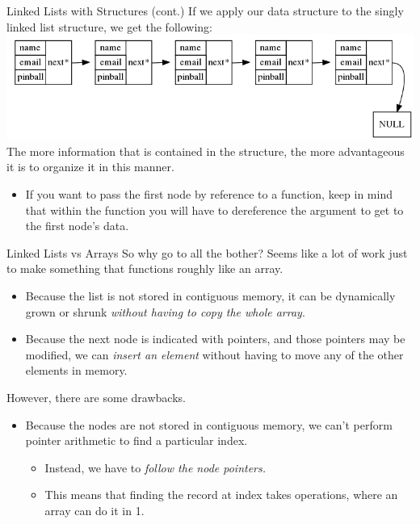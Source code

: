 \documentclass[11pt]{beamer}
\let\OldTexttt\texttt
\renewcommand{\texttt}[1]{\OldTexttt{\color{teal}{#1}}}
\begin{document}
\begin{frame}{Linked Lists with Structures (cont.)}
If we apply our data structure to the singly linked list structure, we get the following:
\center
\includegraphics[scale=0.3]{graphs/SLL.png}
\flushleft
The more information that is contained in the structure, the more advantageous it is to organize it in this manner.  
\begin{itemize}
\item If you want to pass the first node by reference to a function, keep in mind that within the function you will have to dereference the argument to get to the first node's data. 
\end{itemize}
\end{frame}

\begin{frame}{Linked Lists vs Arrays}
So why go to all the bother?  Seems like a lot of work just to make something that functions roughly like an array.  
\begin{itemize}
\item Because the list is not stored in contiguous memory, it can be dynamically grown or shrunk \emph{without having to copy the whole array}.  
\item Because the next node is indicated with pointers, and those pointers may be modified, we can \emph{insert an element} without having to move any of the other elements in memory.  
\end{itemize}
However, there are some drawbacks.
\begin{itemize}
\item Because the nodes are not stored in contiguous memory, we can't perform pointer arithmetic to find a particular index.  
\begin{itemize}
\item Instead, we have to \emph{follow the node pointers.}
\item This means that finding the record at index \texttt{i} takes \texttt{i} operations, where an array can do it in 1.  
\end{itemize}
\end{itemize}
\end{frame}
\end{document}
